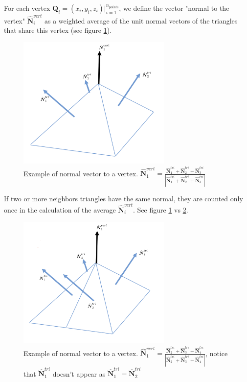 \documentclass[11pt, oneside]{article}
\newcommand\bN{\boldsymbol N}
\newcommand\bQ{\boldsymbol Q}
\begin{document}
For each vertex $\bQ_i=(x_i,y_i,z_i)\big|_{i=1}^{n_{points}}$, we define the vector "normal to the vertex" $\hat{\bN}_i^{vert}$ as a weighted average of the unit normal vectors of the triangles that share this vertex (see figure \ref{normalvert1}).

\begin{figure}[H]
\begin{center}
\includegraphics[width=3in]{normal_vertex.png}%
\end{center}
\caption{Example of normal vector to a vertex. $\hat{\bN}_1^{vert}=\frac{\hat{\bN}_1^{tri}+\hat{\bN}_2^{tri}+\hat{\bN}_3^{tri}}{|\hat{\bN}_1^{tri}+\hat{\bN}_2^{tri}+\hat{\bN}_3^{tri}|}$}
\label{normalvert1}
\end{figure}

If two or more neighbors triangles have the same  normal, they are counted only once in the calculation of the average $\hat{\bN}_i^{vert}$. See figure \ref{normalvert1} vs \ref{normalvert2}.

\begin{figure}[H]
\begin{center}
\includegraphics[width=3in]{normal_vertex_2.png}%
\end{center}
\caption{Example of normal vector to a vertex. $\hat{\bN}_1^{vert}=\frac{\hat{\bN}_2^{tri}+\hat{\bN}_3^{tri}+\hat{\bN}_4^{tri}}{|\hat{\bN}_2^{tri}+\hat{\bN}_3^{tri}+\hat{\bN}_4^{tri}|}$, notice that $\hat{\bN}_1^{tri}$ doesn't appear as $\hat{\bN}_1^{tri}=\hat{\bN}_2^{tri}$}
\label{normalvert2}
\end{figure}
\end{document}
